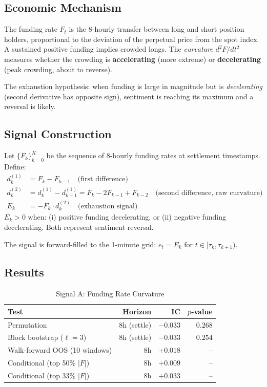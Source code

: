 \documentclass[12pt, a4paper]{article}
\theoremstyle{definition}
\begin{document}
\subsection{Economic Mechanism}

The funding rate $F_t$ is the 8-hourly transfer between long and short
position holders, proportional to the deviation of the perpetual price from
the spot index. A sustained positive funding implies crowded longs. The
\emph{curvature} $d^2F/dt^2$ measures whether the crowding is
\textbf{accelerating} (more extreme) or \textbf{decelerating} (peak crowding,
about to reverse).

The exhaustion hypothesis: when funding is large in magnitude but is
\emph{decelerating} (second derivative has opposite sign), sentiment is
reaching its maximum and a reversal is likely.

\subsection{Signal Construction}

Let $\{F_{k}\}_{k=0}^{K}$ be the sequence of 8-hourly funding rates at
settlement timestamps. Define:
\begin{align}
  d^{(1)}_k &= F_k - F_{k-1} \quad \text{(first difference)}\\
  d^{(2)}_k &= d^{(1)}_k - d^{(1)}_{k-1} = F_k - 2F_{k-1} + F_{k-2}
               \quad \text{(second difference, raw curvature)}\\
  E_k &= -F_k \cdot d^{(2)}_k \quad \text{(exhaustion signal)}
\end{align}
$E_k > 0$ when: (i) positive funding decelerating, or (ii) negative funding
decelerating. Both represent sentiment reversal.

The signal is forward-filled to the 1-minute grid:
$e_t = E_k$ for $t \in [\tau_k, \tau_{k+1})$.

\subsection{Results}

\begin{table}[H]
\centering
\caption{Signal A: Funding Rate Curvature}
\begin{tabular}{lrrr}
\toprule
Test & Horizon & IC & $p$-value \\
\midrule
Permutation & 8h (settle) & $-0.033$ & $0.268$ \\
Block bootstrap ($\ell=3$) & 8h (settle) & $-0.033$ & $0.254$ \\
Walk-forward OOS (10 windows) & 8h & $+0.018$ & -- \\
\midrule
Conditional (top 50\% $|F|$) & 8h & $+0.009$ & -- \\
Conditional (top 33\% $|F|$) & 8h & $+0.033$ & -- \\
\bottomrule
\end{tabular}
\end{table}
\end{document}
